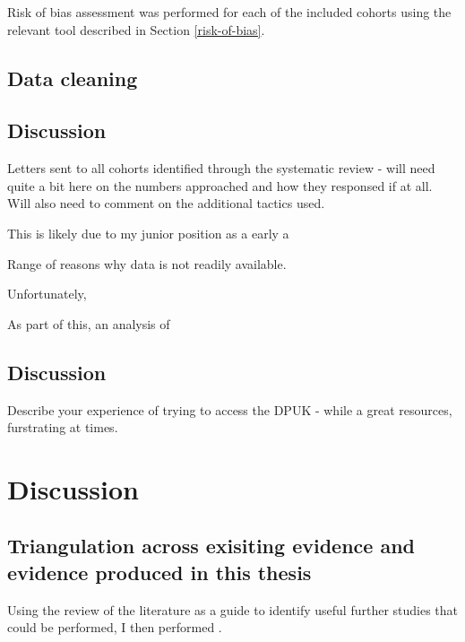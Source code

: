 \documentclass[a4paper, twoside]{templates/ociamthesis}
\begin{document}
Risk of bias assessment was performed for each of the included cohorts using the relevant tool described in Section \ref{risk-of-bias}.

\hypertarget{data-cleaning}{%
\section{Data cleaning}\label{data-cleaning}}

\hypertarget{discussion-3}{%
\section{Discussion}\label{discussion-3}}

Letters sent to all cohorts identified through the systematic review - will need quite a bit here on the numbers approached and how they responsed if at all. Will also need to comment on the additional tactics used.

This is likely due to my junior position as a early a

Range of reasons why data is not readily available.

Unfortunately,

As part of this, an analysis of

\hypertarget{discussion-4}{%
\section{Discussion}\label{discussion-4}}

Describe your experience of trying to access the DPUK - while a great resources, furstrating at times.

\hypertarget{discussion-heading}{%
\chapter{Discussion}\label{discussion-heading}}

\hypertarget{triangulation-across-exisiting-evidence-and-evidence-produced-in-this-thesis}{%
\section{Triangulation across exisiting evidence and evidence produced in this thesis}\label{triangulation-across-exisiting-evidence-and-evidence-produced-in-this-thesis}}

Using the review of the literature as a guide to identify useful further studies that could be performed, I then performed .
\end{document}
